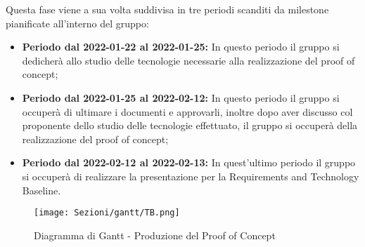 Questa fase viene a sua volta suddivisa in tre periodi scanditi da milestone pianificate all'interno del gruppo:
\begin{itemize}
    \item \textbf{Periodo dal 2022-01-22 al 2022-01-25:} In questo periodo il gruppo si dedicherà allo studio delle tecnologie necessarie alla realizzazione del proof of concept;
    \item \textbf{Periodo dal 2022-01-25 al 2022-02-12:} In questo periodo il gruppo si occuperà di ultimare i documenti e approvarli, inoltre dopo aver discusso col proponente dello studio delle tecnologie effettuato, il gruppo si occuperà della realizzazione del proof of concept;
    \item \textbf{Periodo dal 2022-02-12 al 2022-02-13:} In quest'ultimo periodo il gruppo si occuperà di realizzare la presentazione per la Requirements and Technology Baseline.
\end{itemize}

\begin{figure}[H]
    \centering
    \texttt{[image: Sezioni/gantt/TB.png]}
    \caption{Diagramma di Gantt - Produzione del Proof of Concept}
\end{figure}